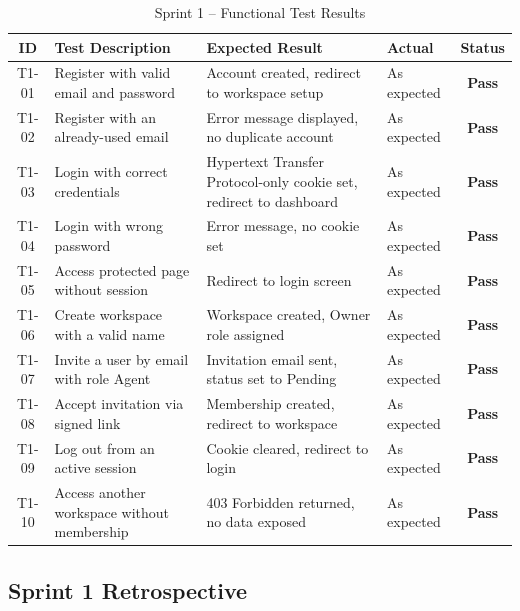 \documentclass[12pt,a4paper]{report}
\newcommand{\reporttablesetup}{%
  \small%
  \setlength{\tabcolsep}{5pt}%
  \renewcommand{\arraystretch}{1.38}%
  \arrayrulecolor{framegray}%
}
\newcommand{\tpass}{\textcolor{passgreen}{\textbf{Pass}}}
\begin{document}
\begin{table}[H]
  \centering
  \renewcommand{\arraystretch}{1.3}
  \footnotesize\reporttablesetup
  \begin{tabularx}{\textwidth}{|c|Y|Y|>{\centering\arraybackslash}p{1.8cm}|c|}
    \hline
    \textbf{ID} & \textbf{Test Description} & \textbf{Expected Result} & \textbf{Actual} & \textbf{Status} \\
    \hline
    T1-01 & Register with valid email and password         & Account created, redirect to workspace setup & As expected & \tpass \\
    \hline
    T1-02 & Register with an already-used email            & Error message displayed, no duplicate account & As expected & \tpass \\
    \hline
    T1-03 & Login with correct credentials                 & Hypertext Transfer Protocol-only cookie set, redirect to dashboard   & As expected & \tpass \\
    \hline
    T1-04 & Login with wrong password                      & Error message, no cookie set                  & As expected & \tpass \\
    \hline
    T1-05 & Access protected page without session          & Redirect to login screen                      & As expected & \tpass \\
    \hline
    T1-06 & Create workspace with a valid name             & Workspace created, Owner role assigned        & As expected & \tpass \\
    \hline
    T1-07 & Invite a user by email with role Agent         & Invitation email sent, status set to Pending  & As expected & \tpass \\
    \hline
    T1-08 & Accept invitation via signed link              & Membership created, redirect to workspace     & As expected & \tpass \\
    \hline
    T1-09 & Log out from an active session                 & Cookie cleared, redirect to login             & As expected & \tpass \\
    \hline
    T1-10 & Access another workspace without membership    & 403 Forbidden returned, no data exposed       & As expected & \tpass \\
    \hline
  \end{tabularx}
  \caption{Sprint 1 -- Functional Test Results}
  \label{tab:test-s1}
\end{table}

\subsection{Sprint 1 Retrospective}
\end{document}
